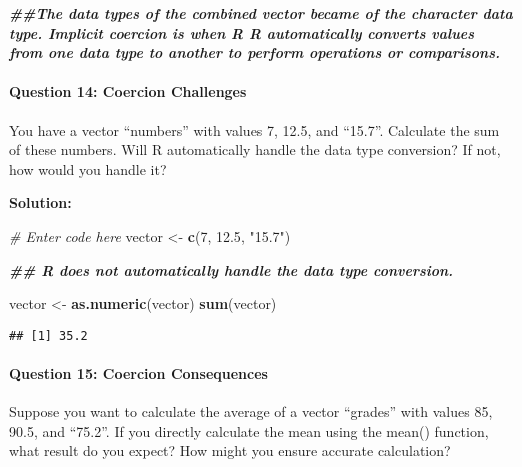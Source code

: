 \documentclass[
]{article}
\newenvironment{Shaded}{\begin{snugshade}}{\end{snugshade}}
\newcommand{\CommentTok}[1]{\textcolor[rgb]{0.56,0.35,0.01}{\textit{#1}}}
\newcommand{\DecValTok}[1]{\textcolor[rgb]{0.00,0.00,0.81}{#1}}
\newcommand{\DocumentationTok}[1]{\textcolor[rgb]{0.56,0.35,0.01}{\textbf{\textit{#1}}}}
\newcommand{\FloatTok}[1]{\textcolor[rgb]{0.00,0.00,0.81}{#1}}
\newcommand{\FunctionTok}[1]{\textcolor[rgb]{0.13,0.29,0.53}{\textbf{#1}}}
\newcommand{\NormalTok}[1]{#1}
\newcommand{\OtherTok}[1]{\textcolor[rgb]{0.56,0.35,0.01}{#1}}
\newcommand{\StringTok}[1]{\textcolor[rgb]{0.31,0.60,0.02}{#1}}
\begin{document}
\begin{Shaded}
\begin{Highlighting}[]
\DocumentationTok{\#\#The data types of the combined vector became of the character data type. Implicit coercion is when R R automatically converts values from one data type to another to perform operations or comparisons.}
\end{Highlighting}
\end{Shaded}

\hypertarget{question-14-coercion-challenges}{%
\paragraph{Question 14: Coercion
Challenges}\label{question-14-coercion-challenges}}

You have a vector ``numbers'' with values 7, 12.5, and ``15.7''.
Calculate the sum of these numbers. Will R automatically handle the data
type conversion? If not, how would you handle it?

\textbf{Solution:}

\begin{Shaded}
\begin{Highlighting}[]
\CommentTok{\# Enter code here}
\NormalTok{vector }\OtherTok{\textless{}{-}} \FunctionTok{c}\NormalTok{(}\DecValTok{7}\NormalTok{, }\FloatTok{12.5}\NormalTok{, }\StringTok{"15.7"}\NormalTok{)}

\DocumentationTok{\#\# R does not automatically handle the data type conversion. }

\NormalTok{vector }\OtherTok{\textless{}{-}} \FunctionTok{as.numeric}\NormalTok{(vector)}
\FunctionTok{sum}\NormalTok{(vector)}
\end{Highlighting}
\end{Shaded}

\begin{verbatim}
## [1] 35.2
\end{verbatim}

\hypertarget{question-15-coercion-consequences}{%
\paragraph{Question 15: Coercion
Consequences}\label{question-15-coercion-consequences}}

Suppose you want to calculate the average of a vector ``grades'' with
values 85, 90.5, and ``75.2''. If you directly calculate the mean using
the mean() function, what result do you expect? How might you ensure
accurate calculation?
\end{document}
